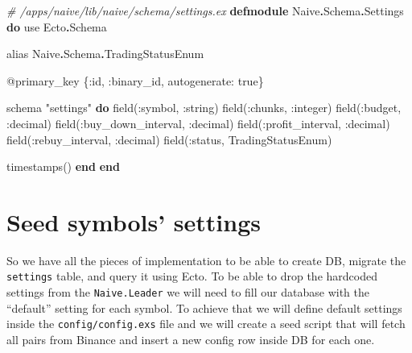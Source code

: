 \documentclass[
]{book}
\newenvironment{Shaded}{\begin{snugshade}}{\end{snugshade}}
\newcommand{\CommentTok}[1]{\textcolor[rgb]{0.56,0.35,0.01}{\textit{#1}}}
\newcommand{\ConstantTok}[1]{\textcolor[rgb]{0.00,0.00,0.00}{#1}}
\newcommand{\ImportTok}[1]{#1}
\newcommand{\KeywordTok}[1]{\textcolor[rgb]{0.13,0.29,0.53}{\textbf{#1}}}
\newcommand{\NormalTok}[1]{#1}
\newcommand{\OperatorTok}[1]{\textcolor[rgb]{0.81,0.36,0.00}{\textbf{#1}}}
\newcommand{\OtherTok}[1]{\textcolor[rgb]{0.56,0.35,0.01}{#1}}
\newcommand{\StringTok}[1]{\textcolor[rgb]{0.31,0.60,0.02}{#1}}
\newcommand{\VariableTok}[1]{\textcolor[rgb]{0.00,0.00,0.00}{#1}}
\begin{document}
\begin{Shaded}
\begin{Highlighting}[]
\CommentTok{\# /apps/naive/lib/naive/schema/settings.ex}
\KeywordTok{defmodule} \ConstantTok{Naive}\OperatorTok{.}\ConstantTok{Schema}\OperatorTok{.}\ConstantTok{Settings} \KeywordTok{do}
  \ImportTok{use} \ConstantTok{Ecto}\OperatorTok{.}\ConstantTok{Schema}

  \ImportTok{alias} \ConstantTok{Naive}\OperatorTok{.}\ConstantTok{Schema}\OperatorTok{.}\ConstantTok{TradingStatusEnum}

  \OtherTok{@primary\_key}\NormalTok{ \{}\VariableTok{:id}\NormalTok{, }\VariableTok{:binary\_id}\NormalTok{, }\VariableTok{autogenerate:} \ConstantTok{true}\NormalTok{\}}

\NormalTok{  schema }\StringTok{"settings"} \KeywordTok{do}
\NormalTok{    field(}\VariableTok{:symbol}\NormalTok{, }\VariableTok{:string}\NormalTok{)}
\NormalTok{    field(}\VariableTok{:chunks}\NormalTok{, }\VariableTok{:integer}\NormalTok{)}
\NormalTok{    field(}\VariableTok{:budget}\NormalTok{, }\VariableTok{:decimal}\NormalTok{)}
\NormalTok{    field(}\VariableTok{:buy\_down\_interval}\NormalTok{, }\VariableTok{:decimal}\NormalTok{)}
\NormalTok{    field(}\VariableTok{:profit\_interval}\NormalTok{, }\VariableTok{:decimal}\NormalTok{)}
\NormalTok{    field(}\VariableTok{:rebuy\_interval}\NormalTok{, }\VariableTok{:decimal}\NormalTok{)}
\NormalTok{    field(}\VariableTok{:status}\NormalTok{, }\ConstantTok{TradingStatusEnum}\NormalTok{)}

\NormalTok{    timestamps()}
  \KeywordTok{end}
\KeywordTok{end}
\end{Highlighting}
\end{Shaded}

\hypertarget{seed-symbols-settings}{%
\section{Seed symbols' settings}\label{seed-symbols-settings}}

So we have all the pieces of implementation to be able to create DB, migrate the \texttt{settings} table, and query it using Ecto. To be able to drop the hardcoded settings from the \texttt{Naive.Leader} we will need to fill our database with the ``default'' setting for each symbol. To achieve that we will define default settings inside the \texttt{config/config.exs} file and we will create a seed script that will fetch all pairs from Binance and insert a new config row inside DB for each one.
\end{document}
